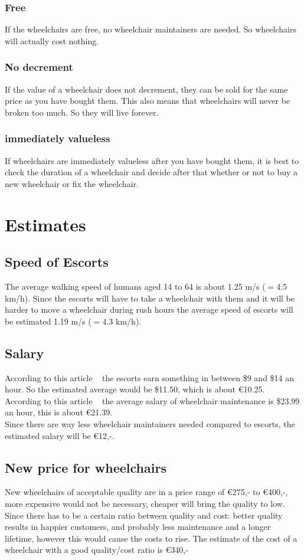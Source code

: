 \documentclass[a4paper, 11pt, notitlepage]{report}
\begin{document}
\subsection{Free}
If the wheelchairs are free, no wheelchair maintainers are needed. So wheelchairs will actually cost nothing.
\subsection{No decrement}
If the value of a wheelchair does not decrement, they can be sold for the same price as you have bought them. This also means that wheelchairs will never be broken too much. So they will live forever.
\subsection{immediately valueless}
If wheelchairs are immediately valueless after you have bought them, it is best to check the duration of a wheelchair and decide after that whether or not to buy a new wheelchair or fix the wheelchair.
\chapter{Estimates}
    \section{Speed of Escorts}
    The average walking speed of humans aged 14 to 64 is about 1.25 m/s  ($=$4.5 km/h). Since the escorts will have to take a wheelchair with them and it will be harder to move a wheelchair during rush hours the average speed of escorts will be estimated 1.19 m/s ($=$4.3 km/h).
    \section{Salary}
    According to this article ~\cite{ref1} the escorts earn something in between \$9 and \$14 an hour. So the estimated average would be \$11.50, which is about \euro{10.25}.\\
    According to this article ~\cite{ref2} the average salary of wheelchair maintenance is \$23.99 an hour, this is about \euro{21.39}.\\
    Since there are way less wheelchair maintainers needed compared to escorts, the estimated salary will be \euro{12,-}.
    \section{New price for wheelchairs}
    New wheelchairs of acceptable quality are in a price range of \euro{275,-} to \euro{400,-}, more expensive would not be necessary, cheaper will bring the quality to low. Since there has to be a certain ratio between quality and cost: better quality results in happier customers, and probably less maintenance and a longer lifetime, however this would cause the costs to rise. The estimate of the cost of a wheelchair with a good quality/cost ratio is \euro{340,-}
\end{document}
